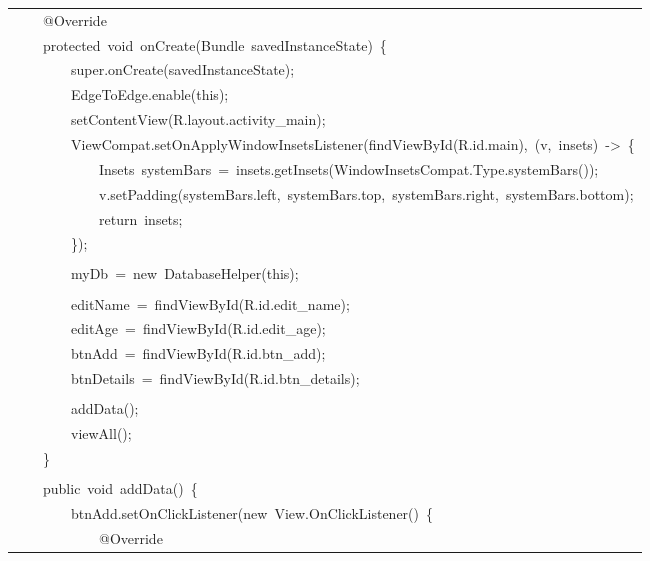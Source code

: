 \documentclass[a4paper,12pt]{article}
\begin{document}
\begin{longtable}{|p{}|}
{\ttfamily\small \ \ \ \ @Override} \\
{\ttfamily\small \ \ \ \ protected\ void\ onCreate(Bundle\ savedInstanceState)\ \{} \\
{\ttfamily\small \ \ \ \ \ \ \ \ super.onCreate(savedInstanceState);} \\
{\ttfamily\small \ \ \ \ \ \ \ \ EdgeToEdge.enable(this);} \\
{\ttfamily\small \ \ \ \ \ \ \ \ setContentView(R.layout.activity\_main);} \\
{\ttfamily\small \ \ \ \ \ \ \ \ ViewCompat.setOnApplyWindowInsetsListener(findViewById(R.id.main),\ (v,\ insets)\ -\textgreater{}\ \{} \\
{\ttfamily\small \ \ \ \ \ \ \ \ \ \ \ \ Insets\ systemBars\ =\ insets.getInsets(WindowInsetsCompat.Type.systemBars());} \\
{\ttfamily\small \ \ \ \ \ \ \ \ \ \ \ \ v.setPadding(systemBars.left,\ systemBars.top,\ systemBars.right,\ systemBars.bottom);} \\
{\ttfamily\small \ \ \ \ \ \ \ \ \ \ \ \ return\ insets;} \\
{\ttfamily\small \ \ \ \ \ \ \ \ \});} \\
\strut \\
{\ttfamily\small \ \ \ \ \ \ \ \ myDb\ =\ new\ DatabaseHelper(this);} \\
\strut \\
{\ttfamily\small \ \ \ \ \ \ \ \ editName\ =\ findViewById(R.id.edit\_name);} \\
{\ttfamily\small \ \ \ \ \ \ \ \ editAge\ =\ findViewById(R.id.edit\_age);} \\
{\ttfamily\small \ \ \ \ \ \ \ \ btnAdd\ =\ findViewById(R.id.btn\_add);} \\
{\ttfamily\small \ \ \ \ \ \ \ \ btnDetails\ =\ findViewById(R.id.btn\_details);} \\
\strut \\
{\ttfamily\small \ \ \ \ \ \ \ \ addData();} \\
{\ttfamily\small \ \ \ \ \ \ \ \ viewAll();} \\
{\ttfamily\small \ \ \ \ \}} \\
\strut \\
{\ttfamily\small \ \ \ \ public\ void\ addData()\ \{} \\
{\ttfamily\small \ \ \ \ \ \ \ \ btnAdd.setOnClickListener(new\ View.OnClickListener()\ \{} \\
{\ttfamily\small \ \ \ \ \ \ \ \ \ \ \ \ @Override} \\

\end{longtable}
\end{document}
